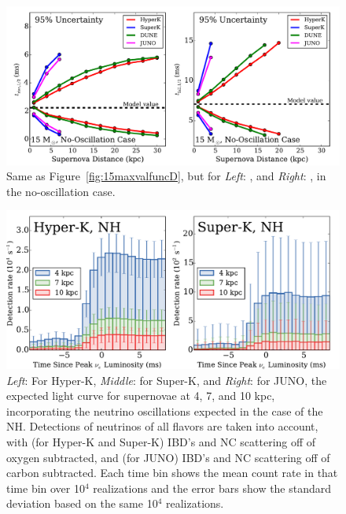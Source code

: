 \begin{figure}[h]
\centerline{\includegraphics[width=\linewidth]{wh07_15_40g_parametergroup_2_95_funcdistance.pdf}}
\caption{\label{fig:15lwhmrwhmfuncD} Same as
  Figure~\ref{fig:15maxvalfuncD}, but for {\it Left}: \trise, and {\it
    Right}: \tfall, in the no-oscillation case.}
\end{figure}


\afterpage{\clearpage}

\begin{figure}[*h]
\centerline{\includegraphics[width=\linewidth]{backgrounds_histogram_groupingnumber_0_NH.pdf}}
\caption{\label{fig:hyperk_superk_juno_nh_backgrounds} {\it Left}: For Hyper-K,
  {\it Middle}: for Super-K, and {\it Right}: for JUNO, the expected light curve
  for supernovae at 4, 7, and 10 kpc, incorporating the neutrino
  oscillations expected in the case of the NH.  Detections of neutrinos of all
  flavors are taken into account, with (for Hyper-K and Super-K) IBD's and NC scattering off of oxygen
  subtracted, and (for JUNO) IBD's and NC scattering off of carbon
  subtracted.  Each time bin shows the mean
  count rate in that time bin over 10$^4$ realizations and the error
  bars show the standard deviation based on the same 10$^4$
  realizations.}
\end{figure}

